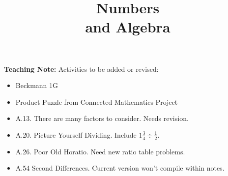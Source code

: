 \documentclass[justified,openany,nofonts]{tufte-book}
\title{Numbers \\ and Algebra}
\author{\teachingnotes}
\newenvironment{teachingnote}{\begin{framed}\noindent \textbf{Teaching Note:}}{\end{framed}}
\begin{document}
\def\document#1{} %
\maketitle


\vspace{1in}

\begin{teachingnote}
Activities to be added or revised:  
\begin{itemize}
\item Beckmann 1G
\item Product Puzzle from Connected Mathematics Project 
\item A.13. There are many factors to consider.  Needs revision. 
\item A.20. Picture Yourself Dividing.  Include $1\frac{3}{4 }\div \frac{1}{2}$. 
\item A.26. Poor Old Horatio.  Need new ratio table problems.
\item A.54  Second Differences.  Current version won't compile within notes.  
\end{itemize}
\end{teachingnote}

%
%
%
%
%


\newpage
\setcounter{secnumdepth}{2}%






\end{document}
